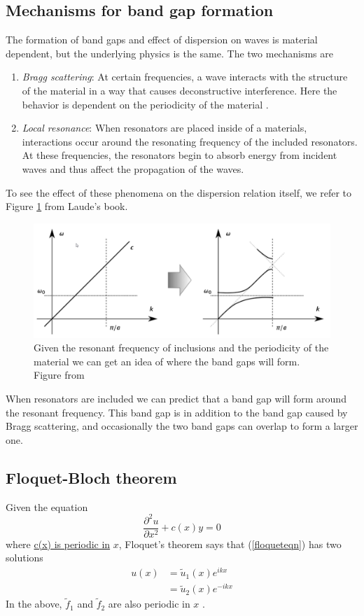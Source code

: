 \documentclass{article}
\begin{document}
\subsection{Mechanisms for band gap formation}
The formation of band gaps and effect of dispersion on waves is material 
dependent, but the underlying physics is the same. The two mechanisms are
\begin{enumerate}
	\item \emph{Bragg scattering}: At certain frequencies, a wave interacts 
	with the structure of the material in a way that causes deconstructive 
	interference. Here the behavior is dependent on the periodicity of the 
	material \cite{laude15}.
	\item \emph{Local resonance}: When resonators are placed inside of a 
	materials, interactions occur around the resonating frequency of the 
	included resonators. At these frequencies, the resonators begin to absorb 
	energy from incident waves and thus affect the propagation of the waves.
\end{enumerate}
To see the effect of these phenomena on the dispersion relation itself, we 
refer to Figure \ref{fig:bslr} from Laude's book.
\begin{figure}[!htbp]
	\centering
	\includegraphics[width=.75\textwidth]{bandgaps.png}
	\caption{Given the resonant frequency of inclusions and the periodicity of 
	the material we can get an idea of where the band gaps will form. Figure 
	from \cite{laude15}}
	\label{fig:bslr}
\end{figure}
When resonators are included we can predict that a band gap will form around 
the resonant frequency. This band gap is in addition to the band gap caused by 
Bragg scattering, and occasionally the two band gaps can overlap to form a 
larger one.

\subsection{Floquet-Bloch theorem} \label{fbt}
Given the equation
\begin{equation} \label{floqueteqn}
\frac{\partial^2 u}{\partial x^2} + c(x)y = 0
\end{equation}
where \underline{c(x) is periodic in} $x$, Floquet's theorem says that 
(\ref{floqueteqn}) has two solutions
\begin{align*}
u(x) &= \tilde{u}_1(x)e^{ikx} \\
&= \tilde{u}_2(x)e^{-ikx}
\end{align*}
In the above, $\tilde{f}_1$ and $\tilde{f}_2$ are also periodic in $x$ 
\cite{magnus79}.
\end{document}
